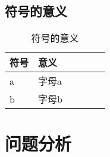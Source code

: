 \documentclass[12pt]{article}
\begin{document}
{       \subsection{符号的意义}
       \begin{table}[H]        
        \setlength{\abovecaptionskip}{-5mm}
        \setlength{\belowcaptionskip}{-3mm}
        \caption{\heiti{}符号的意义}
        \vspace{20pt}
        \centering
        \begin{tabular}{p{2cm}p{3cm}p{2.5cm}p{2.5cm}p{2.5cm}p{2.5cm}}
            \hline
            符号 & 意义 \\
            \hline
           a & 字母a\\
           b & 字母b\\    
            \hline       
        \end{tabular}
        \label{bs2}
    \end{table}

       
       {\centering\section{问题分析}}%
}
\end{document}
